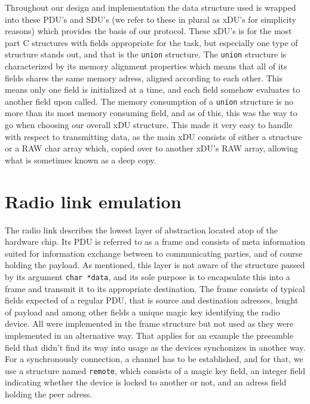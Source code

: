 \documentclass{article}
\newcommand{\code}[1]{\texttt{#1}}
\begin{document}
	Throughout our design and implementation the data structure used is wrapped into these PDU's  and SDU's (we refer to these in plural as xDU's for simplicity reasons) which provides the basis of our protocol. These xDU's is for the most part C structures with fields appropriate for the task, but especially one type of structure stands out, and that is the \code{union} structure. The \code{union} structure is characterized by its memory alignment properties which means that all of its fields shares the same memory adress, aligned according to each other. This means only one field is initialized at a time, and each field somehow evaluates to another field upon called. The memory consumption of a \code{union} structure is no more than its most memory consuming field, and as of this, this was the way to go when choosing our overall xDU structure. This made it very easy to handle with respect to transmitting data, as the main xDU consists of either a structure or a RAW char array which, copied over to another xDU's RAW array, allowing what is sometimes known as a deep copy.
	
	\section{Radio link emulation}
	
	The radio link describes the lowest layer of abstraction located atop of the hardware chip. Its PDU is referred to as a frame and consists of meta information suited for information exchange between to communicating parties, and of course holding the payload. As mentioned, this layer is not aware of the structure passed by its argument \code{char *data}, and its sole purpose is to encapsulate this into a frame and transmit it to its appropriate destination. The frame consists of typical fields expected of a regular PDU, that is source and destination adresses, lenght of payload and among other fields a unique magic key identifying the radio device. All were implemented in the frame structure but not used as they were implemented in an alternative way. That applies for an example the preeamble field that didn't find its way into usage as the devices synchonizes in another way. For a synchronously connection, a channel has to be established, and for that, we use a structure named \code{remote}, which consists of a magic key field, an integer field indicating whether the device is locked to another or not, and an adress field holding the peer adress. \\
	
\end{document}
